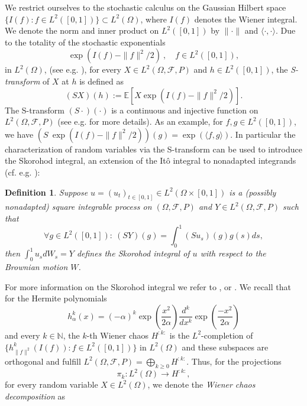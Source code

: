 \documentclass[a4paper,11pt,reqno]{amsart}
\theoremstyle{plain}
\newtheorem{definition}[theorem]{Definition}
\def\N{\mathbb{N}}
\def\ex{\mathbb{E}}
\numberwithin{equation}{section}
\begin{document}
We restrict ourselves to the stochastic calculus on the Gaussian Hilbert space $\{I(f) : f \in L^2([0,1])\} \subset L^2(\Omega)$, where $I(f)$ denotes the Wiener integral. We denote the norm and inner product on $L^2([0,1])$ by $\|\cdot \|$ and $\langle \cdot, \cdot\rangle$. Due to the totality of the stochastic exponentials
\begin{equation*}\label{eq:WickExponential}
\exp\left(I(f) - \|f\|^2/2\right)\ , \quad f \in L^2([0,1]), 
\end{equation*}
in $L^2(\Omega)$, (see e.g. \cite[Corollary 3.40]{Janson}), for every $X \in L^2(\Omega, \mathcal{F}, P)$ and $h \in L^2([0,1])$, the \emph{S-transform} of $X$ at $h$ is defined as
\[
(SX)(h) := \ex[X \exp\left(I(f) - \|f\|^2/2\right)]. 
\]
The S-transform $(S \cdot)(\cdot)$ is a continuous and injective function on $L^2(\Omega, \mathcal{F}, P)$ (see e.g. \cite[Chapter 16]{Janson} for more details). As an example, for $f,g \in L^2([0,1])$, we have $(S \ \exp\left(I(f) - \|f\|^2/2\right))(g) = \exp\left(\langle f,g\rangle\right)$. In particular the characterization of random variables via the S-transform can be used to introduce the Skorohod integral, an extension of the It\^{o} integral to nonadapted integrands (cf. e.g. \cite[Section 16.4]{Janson}): 
\begin{definition}
Suppose $u=(u_t)_{t \in [0,1]} \in L^2(\Omega \times [0,1])$ is a (possibly nonadapted) square integrable process on $(\Omega, \mathcal{F}, P)$ and $Y \in L^2(\Omega, \mathcal{F}, P)$ such that
\[
\forall g \in L^2([0,1]): \ (S Y)(g) = \int_{0}^{1} (S u_s)(g) g(s) ds, 
\]
then $\int_{0}^{1}u_s dW_{s} = Y$ defines the Skorohod integral of $u$ with respect to the Brownian motion $W$. 
\end{definition}
For more information on the Skorohod integral we refer to \cite{Janson}, \cite{Kuo} or \cite{Nualart}. 
We recall that for the Hermite polynomials
\begin{equation*} 
h^{k}_{\alpha}(x) = (-\alpha)^{k} \exp\left(\frac{x^2}{2\alpha}\right) \frac{d^k}{dx^k} \exp\left(\frac{- x^2}{2\alpha}\right) 
\end{equation*} 
and every $k \in \N$, the $k$-th Wiener chaos $H^{:k:}$ is the $L^2$-completion of $\{h^k_{\| f \|^2}(I(f)) : f \in L^2([0,1])\}$ in $L^2(\Omega)$ and these subspaces are orthogonal and fulfill $L^2(\Omega, \mathcal{F}, P) = \bigoplus_{k \geq 0} H^{:k:}$. Thus, for the projections 
\[
\pi_k: L^2(\Omega) \rightarrow H^{:k:},
\]
for every random variable $X \in L^2(\Omega)$, we denote the \emph{Wiener chaos decomposition} as
\end{document}
